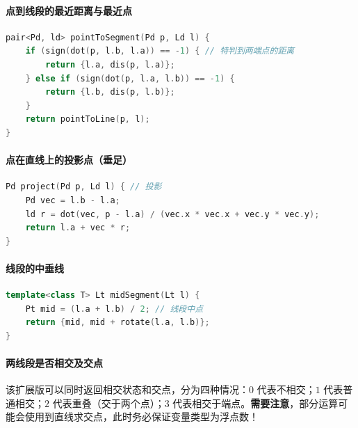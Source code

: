 \hypertarget{ux70b9ux5230ux7ebfux6bb5ux7684ux6700ux8fd1ux8dddux79bbux4e0eux6700ux8fd1ux70b9}{%
\paragraph{点到线段的最近距离与最近点}\label{ux70b9ux5230ux7ebfux6bb5ux7684ux6700ux8fd1ux8dddux79bbux4e0eux6700ux8fd1ux70b9}}

\begin{lstlisting}[language={C++}]
pair<Pd, ld> pointToSegment(Pd p, Ld l) {
    if (sign(dot(p, l.b, l.a)) == -1) { // 特判到两端点的距离
        return {l.a, dis(p, l.a)};
    } else if (sign(dot(p, l.a, l.b)) == -1) {
        return {l.b, dis(p, l.b)};
    }
    return pointToLine(p, l);
}
\end{lstlisting}

\hypertarget{ux70b9ux5728ux76f4ux7ebfux4e0aux7684ux6295ux5f71ux70b9ux5782ux8db3}{%
\paragraph{点在直线上的投影点（垂足）}\label{ux70b9ux5728ux76f4ux7ebfux4e0aux7684ux6295ux5f71ux70b9ux5782ux8db3}}

\begin{lstlisting}[language={C++}]
Pd project(Pd p, Ld l) { // 投影
    Pd vec = l.b - l.a;
    ld r = dot(vec, p - l.a) / (vec.x * vec.x + vec.y * vec.y);
    return l.a + vec * r;
}
\end{lstlisting}

\hypertarget{ux7ebfux6bb5ux7684ux4e2dux5782ux7ebf}{%
\paragraph{线段的中垂线}\label{ux7ebfux6bb5ux7684ux4e2dux5782ux7ebf}}

\begin{lstlisting}[language={C++}]
template<class T> Lt midSegment(Lt l) {
    Pt mid = (l.a + l.b) / 2; // 线段中点
    return {mid, mid + rotate(l.a, l.b)};
}
\end{lstlisting}

\hypertarget{ux4e24ux7ebfux6bb5ux662fux5426ux76f8ux4ea4ux53caux4ea4ux70b9}{%
\paragraph{两线段是否相交及交点}\label{ux4e24ux7ebfux6bb5ux662fux5426ux76f8ux4ea4ux53caux4ea4ux70b9}}

该扩展版可以同时返回相交状态和交点，分为四种情况：\(0\) 代表不相交；\(1\) 代表普通相交；\(2\) 代表重叠（交于两个点）；\(3\) 代表相交于端点。\textbf{需要注意}，部分运算可能会使用到直线求交点，此时务必保证变量类型为浮点数！

